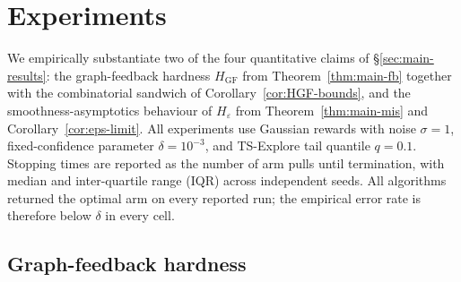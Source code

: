 %
%

\section{Experiments}\label{sec:experiments}

We empirically substantiate two of the four quantitative claims of
\S\ref{sec:main-results}: the graph-feedback hardness $H_{\mathrm{GF}}$ from
Theorem~\ref{thm:main-fb} together with the combinatorial sandwich of
Corollary~\ref{cor:HGF-bounds}, and the smoothness-asymptotics behaviour of
$H_\varepsilon$ from Theorem~\ref{thm:main-mis} and
Corollary~\ref{cor:eps-limit}. All experiments use Gaussian rewards with
noise $\sigma=1$, fixed-confidence parameter $\delta=10^{-3}$, and
TS-Explore tail quantile $q=0.1$. Stopping times are reported as the number
of arm pulls until termination, with median and inter-quartile range (IQR)
across independent seeds. All algorithms returned the optimal arm on every
reported run; the empirical error rate is therefore below $\delta$ in every
cell.

\subsection{Graph-feedback hardness}
\label{sec:exp-density}

